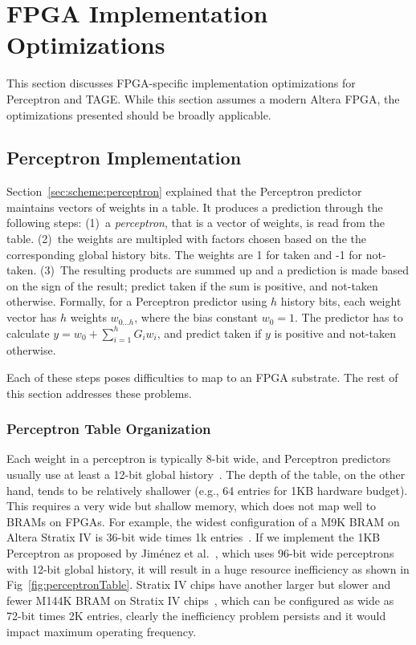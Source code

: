 \documentclass[conference]{IEEEtran}
\begin{document}
\section{FPGA Implementation Optimizations}
\label{sec:fpga}
This section discusses FPGA-specific implementation optimizations for Perceptron and TAGE. While this section assumes a modern Altera FPGA, the optimizations presented should be broadly applicable.

\subsection{Perceptron Implementation}
\label{sec:fpga:perceptron}

Section~\ref{sec:scheme:perceptron} explained that the Perceptron predictor maintains vectors of weights in a table. It produces a prediction through the following steps: (1)~a \textit{perceptron}, that is a vector of weights, is read from the table. (2)~the weights are multipled with factors chosen based on the the corresponding global history bits. The weights are 1 for taken and -1 for not-taken. (3)~The resulting products are summed up and a prediction is made based on the sign of the result; predict taken if the sum is positive, and not-taken otherwise. Formally, for a Perceptron predictor using $h$ history bits, each weight vector has $h$ weights $w_{0...h}$, where the bias constant $w_0 = 1$. The predictor has to calculate $y = w_0 + \sum_{i=1}^{h} G_iw_i$, and predict taken if $y$ is positive and not-taken otherwise.

Each of these steps poses difficulties to map to an FPGA substrate. The rest of this section addresses these problems.

\subsubsection{Perceptron Table Organization}
\label{sec:fpga:perceptron:table}
Each weight in a perceptron is typically 8-bit wide, and Perceptron predictors usually use at least a 12-bit global history~\cite{perceptron}. The depth of the table, on the other hand, tends to be relatively shallower (e.g., 64 entries for 1KB hardware budget). This requires a very wide but shallow memory, which does not map well to BRAMs on FPGAs. For example, the widest configuration of a M9K BRAM on Altera Stratix IV is 36-bit wide times 1k entries~\cite{StratixIVM9K}. If we implement the 1KB Perceptron as proposed by Jim\'enez et al.~\cite{perceptron}, which uses 96-bit wide perceptrons with 12-bit global history, it will result in a huge resource inefficiency as shown in Fig~\ref{fig:perceptronTable}. Stratix IV chips have another larger but slower and fewer M144K BRAM on Stratix IV chips~\cite{StratixIVM9K}, which can be configured as wide as 72-bit times 2K entries, clearly the inefficiency problem persists and it would impact maximum operating frequency.
\end{document}
